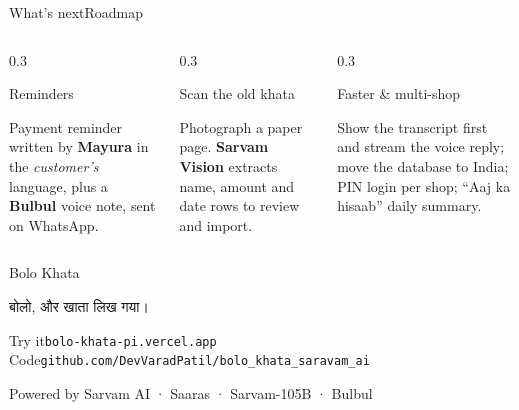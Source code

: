 \documentclass[aspectratio=169,10pt]{beamer}
\begin{document}
\begin{frame}{What's next}{Roadmap}
  \begin{columns}[T]
    \begin{column}{0.3\textwidth}
      \begin{appcard}[height=4.3cm]
        {\semibold Reminders}\par\vspace{4pt}
        \small Payment reminder written by \textbf{Mayura} in the \emph{customer's} language, plus a \textbf{Bulbul} voice note, sent on WhatsApp.
      \end{appcard}
    \end{column}
    \begin{column}{0.3\textwidth}
      \begin{appcard}[height=4.3cm]
        {\semibold Scan the old khata}\par\vspace{4pt}
        \small Photograph a paper page. \textbf{Sarvam Vision} extracts name, amount and date rows to review and import.
      \end{appcard}
    \end{column}
    \begin{column}{0.3\textwidth}
      \begin{appcard}[height=4.3cm]
        {\semibold Faster \& multi-shop}\par\vspace{4pt}
        \small Show the transcript first and stream the voice reply; move the database to India; PIN login per shop; “Aaj ka hisaab” daily summary.
      \end{appcard}
    \end{column}
  \end{columns}
\end{frame}

\begin{frame}[plain]
  \vspace*{2.2cm}
  \centering
  {\semibold\fontsize{34}{38}\selectfont Bolo Khata}\par\vspace{6pt}
  {\deva\Large\color{muted} बोलो, और खाता लिख गया।}\par\vspace{22pt}
  \begin{minipage}{0.78\textwidth}
    \begin{inkcard}[halign=center]
      \small
      Try it\enspace\texttt{bolo-khata-pi.vercel.app}\\[3pt]
      Code\enspace\texttt{github.com/DevVaradPatil/bolo\_khata\_saravam\_ai}
    \end{inkcard}
  \end{minipage}\par\vspace{10pt}
  {\footnotesize\color{muted} Powered by Sarvam AI · Saaras · Sarvam-105B · Bulbul}
\end{frame}
\end{document}
